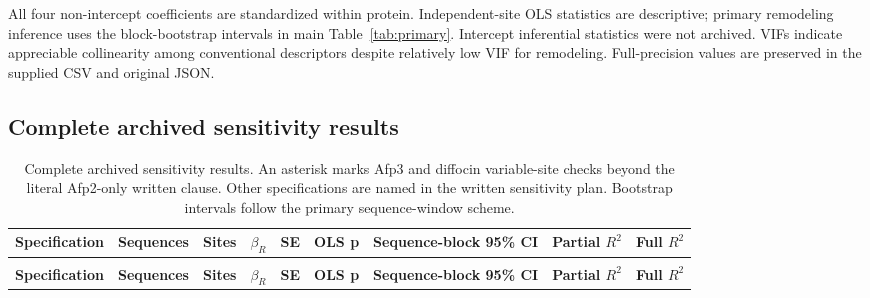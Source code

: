 All four non-intercept coefficients are standardized within protein. Independent-site OLS statistics are descriptive; primary remodeling inference uses the block-bootstrap intervals in main Table~\ref{tab:primary}. Intercept inferential statistics were not archived. VIFs indicate appreciable collinearity among conventional descriptors despite relatively low VIF for remodeling. Full-precision values are preserved in the supplied CSV and original JSON.

\subsection{Complete archived sensitivity results}

\clearpage
\begin{landscape}
\begingroup
\footnotesize
\setlength{\tabcolsep}{3pt}
\renewcommand{\arraystretch}{1.2}
\begin{longtable}{>{\raggedright\arraybackslash}p{}>{\raggedright\arraybackslash}p{}>{\raggedright\arraybackslash}p{}>{\raggedright\arraybackslash}p{}>{\raggedright\arraybackslash}p{}>{\raggedright\arraybackslash}p{}>{\raggedright\arraybackslash}p{}>{\raggedright\arraybackslash}p{}>{\raggedright\arraybackslash}p{}}
\caption{Complete archived sensitivity results. An asterisk marks Afp3 and diffocin variable-site checks beyond the literal Afp2-only written clause. Other specifications are named in the written sensitivity plan. Bootstrap intervals follow the primary sequence-window scheme.}\label{tab:supp5}\\
\toprule
\textbf{Specification} & \textbf{Sequences} & \textbf{Sites} & \textbf{\(\beta_R\)} & \textbf{SE} & \textbf{OLS p} & \textbf{Sequence-block 95\% CI} & \textbf{Partial \(R^2\)} & \textbf{Full \(R^2\)} \\
\midrule
\endfirsthead
\multicolumn{9}{l}{\tablename~\thetable{} (continued)}\\
\toprule
\textbf{Specification} & \textbf{Sequences} & \textbf{Sites} & \textbf{\(\beta_R\)} & \textbf{SE} & \textbf{OLS p} & \textbf{Sequence-block 95\% CI} & \textbf{Partial \(R^2\)} & \textbf{Full \(R^2\)} \\
\midrule
\endhead

\end{longtable}
\end{landscape}
